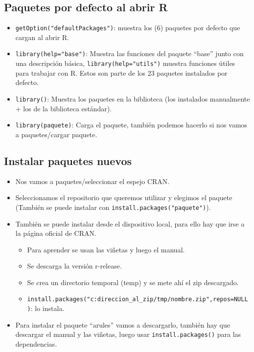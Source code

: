 \documentclass[a4paper, 12pt]{article}
\begin{document}
	\subsection{Paquetes por defecto al abrir R}
	\begin{itemize}
		\item \texttt{getOption("defaultPackages")}: muestra los (6) paquetes por defecto que cargan al abrir R.
		\item \texttt{library(help="base")}: Muestra las funciones del paquete ``base'' junto con una descripción básica, \texttt{library(help=\string"utils")} muestra funciones útiles para trabajar con R. Estos son parte de los 23 paquetes instalados por defecto.
		\item \texttt{library()}: Muestra los paquetes en la biblioteca (los instalados manualmente + los de la biblioteca estándar).
		\item \texttt{library(paquete)}: Carga el paquete, también podemos hacerlo si nos vamos a paquetes/cargar paquete.
	\end{itemize}
	\subsection{Instalar paquetes nuevos}
	\begin{itemize}
		\item Nos vamos a paquetes/seleccionar el espejo CRAN.
		\item Seleccionamos el repositorio que queremos utilizar y elegimos el paquete (También se puede instalar con \texttt{install.packages(\string"paquete")}).
		\item También se puede instalar desde el dispositivo local, para ello hay que irse a la página oficial de CRAN.
		\begin{itemize}
			\item Para aprender se usan las viñetas y luego el manual.
			\item Se descarga la versión r-release.
			\item Se crea un directorio temporal (temp) y se mete ahí el zip descargado.
			\item \texttt{install.packages(\string"c:direccion\_al\_zip/tmp/nombre.zip",repos=NULL)}: lo instala.
		\end{itemize} 
		\item Para instalar el paquete ``arules'' vamos a descargarlo, también hay que descargar el manual y las viñetas, luego usar \texttt{install.packages()} para las dependencias.
	\end{itemize}
	
\end{document}
